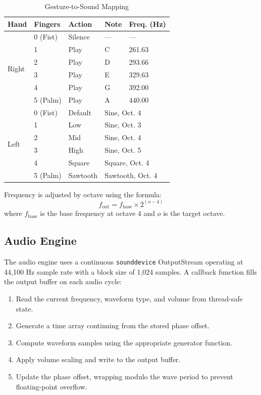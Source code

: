 \documentclass[conference]{IEEEtran}
\begin{document}
\begin{table}[htbp]
\caption{Gesture-to-Sound Mapping}
\label{tab:gesture_mapping}
\centering
\begin{tabular}{p{0.8cm}p{1.5cm}p{1.2cm}p{1cm}p{1.5cm}}
\toprule
\textbf{Hand} & \textbf{Fingers} & \textbf{Action} & \textbf{Note} & \textbf{Freq. (Hz)} \\
\midrule
\multirow{6}{*}{Right} & 0 (Fist) & Silence & --- & --- \\
 & 1 & Play & C & 261.63 \\
 & 2 & Play & D & 293.66 \\
 & 3 & Play & E & 329.63 \\
 & 4 & Play & G & 392.00 \\
 & 5 (Palm) & Play & A & 440.00 \\
\midrule
\multirow{6}{*}{Left} & 0 (Fist) & Default & \multicolumn{2}{l}{Sine, Oct. 4} \\
 & 1 & Low & \multicolumn{2}{l}{Sine, Oct. 3} \\
 & 2 & Mid & \multicolumn{2}{l}{Sine, Oct. 4} \\
 & 3 & High & \multicolumn{2}{l}{Sine, Oct. 5} \\
 & 4 & Square & \multicolumn{2}{l}{Square, Oct. 4} \\
 & 5 (Palm) & Sawtooth & \multicolumn{2}{l}{Sawtooth, Oct. 4} \\
\bottomrule
\end{tabular}
\end{table}

Frequency is adjusted by octave using the formula:
\begin{equation}
f_{\text{out}} = f_{\text{base}} \times 2^{(o - 4)}
\label{eq:octave}
\end{equation}
where $f_{\text{base}}$ is the base frequency at octave 4 and $o$ is the target octave.

\subsection{Audio Engine}

The audio engine uses a continuous \texttt{sounddevice} OutputStream operating at 44,100 Hz sample rate with a block size of 1,024 samples. A callback function fills the output buffer on each audio cycle:

\begin{enumerate}
\item Read the current frequency, waveform type, and volume from thread-safe state.
\item Generate a time array continuing from the stored phase offset.
\item Compute waveform samples using the appropriate generator function.
\item Apply volume scaling and write to the output buffer.
\item Update the phase offset, wrapping modulo the wave period to prevent floating-point overflow.
\end{enumerate}
\end{document}
